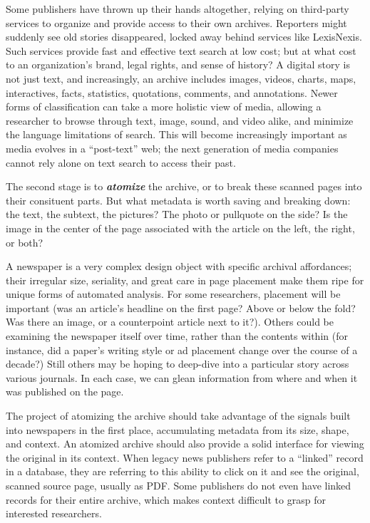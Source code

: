 Some publishers have thrown up their hands altogether, relying on third-party services to organize and provide access to their own archives.\autocite{romenesko_u.s._2014} Reporters might suddenly see old stories disappeared, locked away behind services like LexisNexis. Such services provide fast and effective text search at low cost; but at what cost to an organization's brand, legal rights, and sense of history? A digital story is not just text, and increasingly, an archive includes images, videos, charts, maps, interactives, facts, statistics, quotations, comments, and annotations. Newer forms of classification can take a more holistic view of media, allowing a researcher to browse through text, image, sound, and video alike, and minimize the language limitations of search. This will become increasingly important as media evolves in a ``post-text'' web; the next generation of media companies cannot rely alone on text search to access their past.\autocite{salmon_why_2014}

The second stage is to \textbf{\emph{atomize}} the archive, or to break these scanned pages into their consituent parts. But what metadata is worth saving and breaking down: the text, the subtext, the pictures? The photo or pullquote on the side? Is the image in the center of the page associated with the article on the left, the right, or both?

A newspaper is a very complex design object with specific archival affordances; their irregular size, seriality, and great care in page placement make them ripe for unique forms of automated analysis. For some researchers, placement will be important (was an article's headline on the first page? Above or below the fold? Was there an image, or a counterpoint article next to it?). Others could be examining the newspaper itself over time, rather than the contents within (for instance, did a paper's writing style or ad placement change over the course of a decade?) Still others may be hoping to deep-dive into a particular story across various journals. In each case, we can glean information from where and when it was published on the page.

The project of atomizing the archive should take advantage of the signals built into newspapers in the first place, accumulating metadata from its size, shape, and context. An atomized archive should also provide a solid interface for viewing the original in its context. When legacy news publishers refer to a ``linked'' record in a database, they are referring to this ability to click on it and see the original, scanned source page, usually as PDF. Some publishers do not even have linked records for their entire archive, which makes context difficult to grasp for interested researchers.

